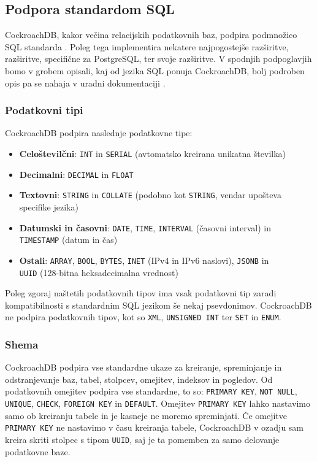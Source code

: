 \documentclass[a4paper, 12pt]{book}
\begin{document}
\subsection{Podpora standardom SQL}
CockroachDB, kakor večina relacijskih podatkovnih baz, podpira podmnožico SQL standarda \cite{CRDB-sql-standard}. Poleg tega implementira nekatere najpogostejše raz\-ši\-rit\-ve, razširitve, specifične za PostgreSQL, ter svoje razširitve. V spodnjih podpoglavjih bomo v grobem opisali, kaj od jezika SQL ponuja CockroachDB, bolj podroben opis pa se nahaja v uradni dokumentaciji \cite{CRDB-sql-features}.

\subsubsection{Podatkovni tipi}
CockroachDB podpira naslednje podatkovne tipe:

\begin{itemize}
    \item \textbf{Celoštevilčni}: \texttt{INT} in \texttt{SERIAL} (avtomatsko kreirana unikatna številka)
    \item \textbf{Decimalni}: \texttt{DECIMAL} in \texttt{FLOAT}
    \item \textbf{Textovni}: \texttt{STRING} in \texttt{COLLATE} (podobno kot \texttt{STRING}, vendar upošteva specifike jezika)
    \item \textbf{Datumski in časovni}: \texttt{DATE}, \texttt{TIME}, \texttt{INTERVAL} (časovni interval) in\\\texttt{TIMESTAMP} (datum in čas)
    \item \textbf{Ostali}: \texttt{ARRAY}, \texttt{BOOL}, \texttt{BYTES}, \texttt{INET} (IPv4 in IPv6 naslovi), \texttt{JSONB} in\\\texttt{UUID} (128-bitna heksadecimalna vrednost)
\end{itemize}

\noindent Poleg zgoraj naštetih podatkovnih tipov ima vsak podatkovni tip zaradi kompatibilnosti s standardnim SQL jezikom še nekaj psevdonimov. CockroachDB ne podpira podatkovnih tipov, kot so \texttt{XML}, \texttt{UNSIGNED INT} ter \texttt{SET} in \texttt{ENUM}.

\newpage
\subsubsection{Shema}
CockroachDB podpira vse standardne ukaze za kreiranje, spreminjanje in odstranjevanje baz, tabel, stolpcev, omejitev, indeksov in pogledov. Od podatkovnih omejitev podpira vse standardne, to so: \texttt{PRIMARY KEY}, \texttt{NOT NULL}, \texttt{UNIQUE}, \texttt{CHECK}, \texttt{FOREIGN KEY} in \texttt{DEFAULT}. Omejitev \texttt{PRIMARY KEY} lahko nastavimo samo ob kreiranju tabele in je kasneje ne moremo spreminjati. Če omejitve \texttt{PRIMARY KEY} ne nastavimo v času kreiranja tabele, CockroachDB v ozadju sam kreira skriti stolpec s tipom \texttt{UUID}, saj je ta pomemben za samo delovanje podatkovne baze.
\end{document}
